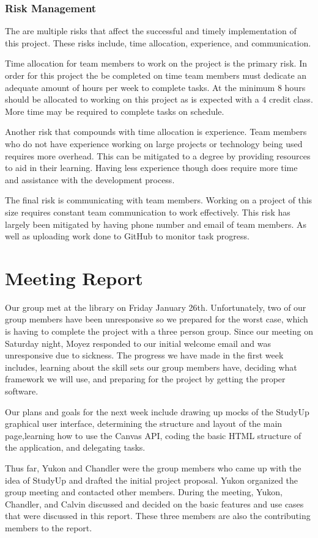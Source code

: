 \documentclass[12pt,letterpaper]{article}
\begin{document}
\subsubsection{Risk Management}
The are multiple risks that affect the successful and timely implementation of this project. These risks include, time allocation, experience, and communication.

Time allocation for team members to work on the project is the primary risk. In order for this project the be completed on time team members must dedicate an adequate amount of hours per week to complete tasks. At the minimum 8 hours should be allocated to working on this project as is expected with a 4 credit class. More time may be required to complete tasks on schedule.

Another risk that compounds with time allocation is experience. Team members who do not have experience working on large projects or technology being used requires more overhead. This can be mitigated to a degree by providing resources to aid in their learning. Having less experience though does require more time and assistance with the development process.

The final risk is communicating with team members. Working on a project of this size requires constant team communication to work effectively. This risk has largely been mitigated by having phone number and email of team members. As well as uploading work done to GitHub to monitor task progress.

\section{Meeting Report}
Our group met at the library on Friday January 26th. Unfortunately, two of our group members have been unresponsive so we prepared for the worst case, which is having to complete the project with a three person group. Since our meeting on Saturday night, Moyez responded to our initial welcome email and was unresponsive due to sickness. The progress we have made in the first week includes, learning about the skill sets our group members have, deciding what framework we will use, and preparing for the project by getting the proper software.

Our plans and goals for the next week include drawing up mocks of the StudyUp graphical user interface, determining the structure and layout of the main page,learning how to use the Canvas API, coding the basic HTML structure of the application, and delegating tasks. 

Thus far, Yukon and Chandler were the group members who came up with the idea of StudyUp and drafted the initial project proposal. Yukon organized the group meeting and contacted other members. During the meeting, Yukon, Chandler, and Calvin discussed and decided on the basic features and use cases that were discussed in this report. These three members are also the contributing members to the report.
\end{document}
